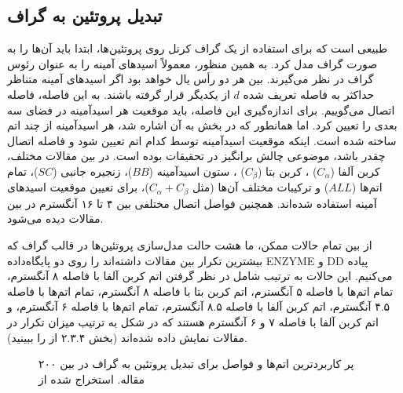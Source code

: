 \subsection{تبدیل پروتئین به گراف}
طبیعی است که برای استفاده از یک گراف کرنل روی پروتئین‌ها، ابتدا باید آن‌ها را به صورت گراف مدل کرد. به همین منظور، معمولاً اسید‌های آمینه را به عنوان رئوس گراف در نظر می‌گیرند. بین هر دو رأس یال خواهد بود اگر اسیدهای آمینه متناظر حداکثر به فاصله تعریف شده $d$ از یکدیگر قرار گرفته باشند. به این فاصله، فاصله اتصال می‌گوییم. برای اندازه‌گیری این فاصله، باید موقعیت هر اسیدآمینه در فضای سه بعدی را تعیین کرد. اما همانطور که در بخش  به آن اشاره شد، هر اسیدآمینه از چند اتم ساخته شده است. اینکه موقعیت اسیدآمینه توسط کدام اتم تعیین شود و فاصله اتصال چقدر باشد، موضوعی چالش برانگیز در تحقیقات بوده است. در بین مقالات مختلف، کربن آلفا 
($C_\alpha$)
، کربن بتا
($C_\beta$)
، ستون اسیدآمینه ($BB$)، زنجیره جانبی ($SC$)، تمام اتم‌ها ($ALL$) و ترکیبات مختلف آن‌ها (مثل $C_\alpha+C_\beta$)، برای تعیین موقعیت اسید‌های آمینه استفاده شده‌اند. همچنین فواصل اتصال مختلفی بین ۴ تا ۱۶ آنگسترم در بین مقالات دیده می‌شود.

از بین تمام حالات ممکن، ما هشت حالت مدل‌سازی پروتئین‌ها در قالب گراف که بیشترین تکرار بین مقالات داشته‌اند را روی دو پایگاه‌داده ENZYME و DD پیاده می‌کنیم. این حالات به ترتیب شامل در نظر گرفتن اتم کربن آلفا با فاصله ۸ آنگسترم، تمام اتم‌ها با فاصله ۵ آنگسترم، اتم کربن بتا با فاصله ۸ آنگسترم، تمام اتم‌ها با فاصله ۴.۵ آنگسترم، اتم کربن آلفا با فاصله ۸.۵ آنگسترم، تمام اتم‌ها با فاصله ۶ آنگسترم، و اتم کربن آلفا با فاصله ۷ و ۶ آنگسترم هستند که در شکل  به ترتیب میزان تکرار در مقالات نمایش داده شده‌اند (بخش ۲.۳.۴ از  را ببینید).

\begin{figure}[ht]
\caption{پر کاربرد‌ترین اتم‌ها و فواصل برای تبدیل پروتئین به گراف در بین ۲۰۰ مقاله. استخراج شده از }
\label{fig:rig-occurance}
\end{figure}

